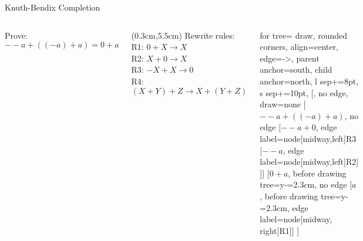 \documentclass[14pt, aspectratio=169]{beamer}
\begin{document}
	\begin{frame}{Knuth-Bendix Completion}
		\begin{columns}
			\vspace*{-3cm}
			\begin{minipage}{\linewidth}
				Prove:\\
				$--a + ((-a) + a) = 0 + a$
			\end{minipage}
			{\begin{textblock*}{2\textwidth}(0.3cm,5.5cm) %
					\footnotesize{Rewrite rules:\\
						R1: $0 + X \rightarrow X$\\
						R2: $X + 0 \rightarrow X$\\
						R3: $-X + X \rightarrow 0$\\
						R4: $(X +Y) + Z \rightarrow X + (Y + Z)$}
			\end{textblock*}}
			\begin{minipage}[c][1\textheight][c]{\linewidth}
				\vspace*{-3.5cm}
				{\begin{forest}
						for tree={
							draw,                   %
							rounded corners,        %
							align=center,           %
							edge={->},              %
							parent anchor=south,    %
							child anchor=north,     %
							l sep+=8pt,            %
							s sep+=10pt,             %
						}
						[\phantom{}, no edge, draw=none
						[$--a + ((-a) + a)$, no edge
						[$--a + 0$, edge label={node[midway,left]{R3}}
						[$--a$, edge label={node[midway,left]{R2}}]
						]]
						[$0 + a$, before drawing tree={y-=2.3cm}, no edge
						[$a$, before drawing tree={y-=2.3cm}, edge label={node[midway, right]{R1}}]]
						]
				\end{forest}}
			\end{minipage}
		\end{columns}
	\end{frame}
\end{document}
